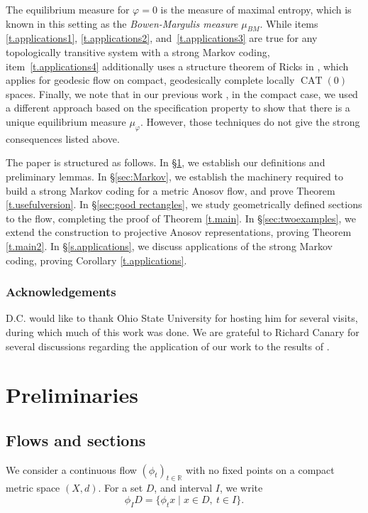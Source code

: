 \documentclass[11pt]{article}
\let\sep\mid
\theoremstyle{definition}
\numberwithin{equation}{section}
\DeclareMathOperator{\CAT}{CAT}
\begin{document}
The equilibrium measure for $\varphi=0$ is the measure of maximal entropy, which is known in this setting as the \emph{Bowen-Margulis measure} $\mu_{BM}$. While items \eqref{t.applications1}, \eqref{t.applications2}, and~\eqref{t.applications3} are true for any topologically transitive system with a strong Markov coding, item~\eqref{t.applications4} additionally uses a structure theorem of Ricks in \cite{ricks}, which applies for geodesic flow on compact, geodesically complete locally $\CAT(0)$ spaces. Finally, we note that in our previous work \cite{CLT}, in the compact case, we used a different approach based on the specification property to show that there is a unique equilibrium measure $\mu_\varphi$. However, those techniques do not give the strong consequences listed above.

The paper is structured as follows. In \S \ref{sec:background}, we establish our definitions and preliminary lemmas. In \S \ref{sec:Markov}, we establish the machinery required to build a strong Markov coding for a metric Anosov flow, and prove Theorem \ref{t.usefulversion}. In \S\ref{sec:good rectangles}, we study geometrically defined sections to the flow, completing the proof of Theorem \ref{t.main}. In \S \ref{sec:twoexamples}, we extend the construction to projective Anosov representations, proving Theorem \ref{t.main2}. In \S \ref{s.applications}, we discuss applications of the strong Markov coding, proving Corollary \ref{t.applications}.

\subsubsection*{Acknowledgements}
D.C. would like to thank Ohio State University for hosting him for several visits, during which much of this work was done. We are grateful to Richard Canary for several discussions regarding the application of our work to the results of \cite{bcls}.

\section{Preliminaries}\label{sec:background}

\subsection{Flows and sections}

We consider a continuous flow $(\phi_t)_{t \in \mathbb R}$ with no fixed points on a compact metric space $(X, d)$. For a set $D$, and interval $I$, we write
\[ \phi_I D = \{\phi_t x \sep x \in D, \ t \in I\}. \]
\end{document}
